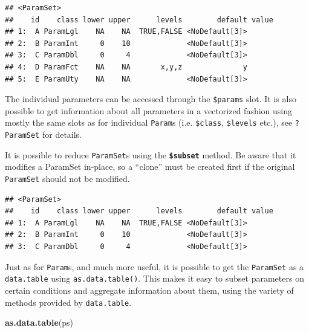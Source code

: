 \documentclass[]{scrbook}
\newenvironment{Shaded}{\begin{snugshade}}{\end{snugshade}}
\newcommand{\KeywordTok}[1]{\textcolor[rgb]{0.13,0.29,0.53}{\textbf{#1}}}
\newcommand{\NormalTok}[1]{#1}
\newcommand{\OperatorTok}[1]{\textcolor[rgb]{0.81,0.36,0.00}{\textbf{#1}}}
\newcommand{\StringTok}[1]{\textcolor[rgb]{0.31,0.60,0.02}{#1}}
\renewenvironment{Shaded} {\begin{snugshade}\small} {\end{snugshade}}
\begin{document}
\begin{verbatim}
## <ParamSet>
##    id    class lower upper      levels        default value
## 1:  A ParamLgl    NA    NA  TRUE,FALSE <NoDefault[3]>      
## 2:  B ParamInt     0    10             <NoDefault[3]>      
## 3:  C ParamDbl     0     4             <NoDefault[3]>      
## 4:  D ParamFct    NA    NA       x,y,z              y      
## 5:  E ParamUty    NA    NA             <NoDefault[3]>
\end{verbatim}

The individual parameters can be accessed through the \texttt{\$params} slot.
It is also possible to get information about all parameters in a vectorized fashion using mostly the same slots as for individual \texttt{Param}s (i.e. \texttt{\$class}, \texttt{\$levels} etc.), see \texttt{?ParamSet} for details.

It is possible to reduce \texttt{ParamSet}s using the \textbf{\texttt{\$subset}} method.
Be aware that it modifies a ParamSet in-place, so a ``clone'' must be created first if the original \texttt{ParamSet} should not be modified.

\begin{Shaded}
\end{Shaded}

\begin{verbatim}
## <ParamSet>
##    id    class lower upper      levels        default value
## 1:  A ParamLgl    NA    NA  TRUE,FALSE <NoDefault[3]>      
## 2:  B ParamInt     0    10             <NoDefault[3]>      
## 3:  C ParamDbl     0     4             <NoDefault[3]>
\end{verbatim}

Just as for \texttt{Param}s, and much more useful, it is possible to get the \texttt{ParamSet} as a \texttt{data.table} using \texttt{as.data.table()}.
This makes it easy to subset parameters on certain conditions and aggregate information about them, using the variety of methods provided by \texttt{data.table}.

\begin{Shaded}
\begin{Highlighting}[]
\KeywordTok{as.data.table}\NormalTok{(ps)}
\end{Highlighting}
\end{Shaded}
\end{document}
